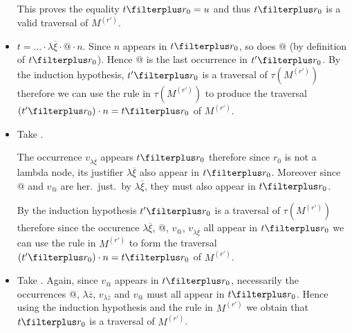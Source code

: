 \begin{itemize}
        This proves the equality $t \filterplus r_0 = u$ and thus $t \filterplus r_0$ is a valid traversal of $M^{(r')}$.

    \item {} $t = \ldots \cdot \lambda \overline{\xi} \cdot @ \cdot n$.
        Since $n$ appears in $t\filterplus r_0$, so does $@$ (by definition of $t\filterplus r_0$). Hence @ is the last occurrence in $t'\filterplus r_0$. By the induction hypothesis, $t' \filterplus r_0$ is a traversal of $\tau(M^{(r')})$ therefore we can use the rule  in $\tau(M^{(r')})$ to produce the traversal $(t'\filterplus r_0) \cdot n = t \filterplus r_0$ of $M^{(r')}$.


    \item {} Take .

        The occurrence $v_{\lambda \overline{\xi}}$ appears
        $t\filterplus r_0$ therefore since $r_0$ is not a lambda
        node, its justifier $\lambda \overline{\xi}$ also appear in
        $t\filterplus r_0$. Moreover since $@$ and $v_@$ are her.\
        just.\ by $\lambda \overline{\xi}$, they must also appear in
        $t\filterplus r_0$.

        By the induction hypothesis $t' \filterplus r_0$ is a
        traversal of $\tau(M^{(r')})$ therefore since the occurence
        $\lambda \overline{\xi}$, @, $v_@$, $v_{\lambda
        \overline{\xi}}$ all appear in $t\filterplus r_0$ we can use
        the rule \rulenamet{Value$^{@\mapsto\lambda}$} in $M^{(r')}$
        to form the traversal $(t'\filterplus r_0) \cdot n = t
        \filterplus r_0$ of $M^{(r')}$.

    \item {}
          Take . Again, since $v_@$ appears in $t
        \filterplus r_0$, necessarily the occurrences @, $\lambda
        \overline{z}$, $v_{\lambda \overline{z}}$ and $v_@$ must all
        appear in $t \filterplus r_0$. Hence using the induction
        hypothesis and the rule
         in $M^{(r')}$ we
        obtain that $t \filterplus r_0$ is a traversal of
        $M^{(r')}$.


\end{itemize}
